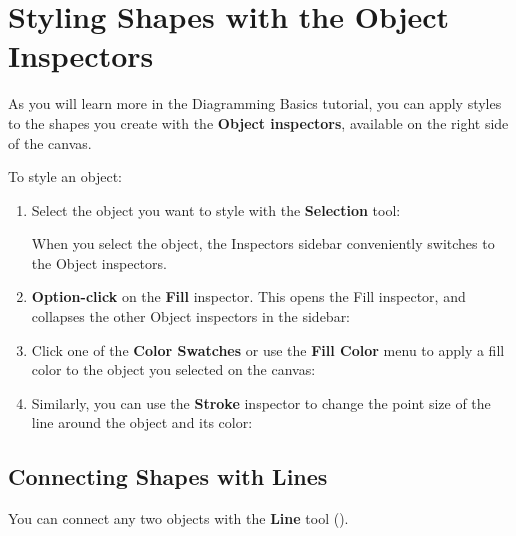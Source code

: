 \documentclass[../main.tex]{subfiles}
\begin{document}
\section{Styling Shapes with the Object Inspectors}

As you will learn more in the Diagramming Basics tutorial, you can apply styles to the shapes
you create with the \textbf{Object inspectors}, available on the right side of the canvas.

To style an object:

\begin{enumerate}
  \item Select the object you want to style with the \textbf{Selection} tool:


    When you select the object, the Inspectors sidebar conveniently switches to the Object
    inspectors.
  \item \textbf{Option-click} on the \textbf{Fill} inspector. This opens the Fill inspector, and
    collapses the other Object inspectors in the sidebar:

  \item Click one of the \textbf{Color Swatches} or use the \textbf{Fill Color} menu to apply a
    fill color to the object you selected on the canvas:


  \item Similarly, you can use the \textbf{Stroke} inspector to change the point size of the
    line around the object and its color:


\end{enumerate}

\subsection{Connecting Shapes with Lines}

You can connect any two objects with the \textbf{Line} tool
().
\end{document}
